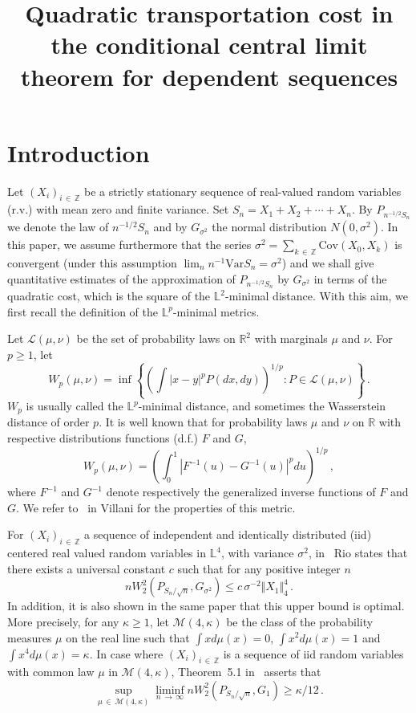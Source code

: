 \documentclass[AHL,Unicode,longabstracts,published]{cedram}
\title[Quadratic transportation cost in the conditional CLT]{Quadratic transportation cost in the conditional central limit theorem for dependent sequences}
\author[\initial{J.} \lastname{Dedecker}]{\firstname{Jérôme} \lastname{Dedecker}}
\author[\initial{F.} \lastname{Merlevède}]{\firstname{Florence} \lastname{Merlevède}}
\author[\initial{E.} \lastname{Rio}]{\firstname{Emmanuel} \lastname{Rio}}
\newcommand{\bbZ}{\mathbb{Z}}
\newcommand{\clL}{\mathcal{L}}
\newcommand{\clM}{\mathcal{M}}
\newcommand{\bbR}{\mathbb{R}}
\newcommand{\bbL}{\mathbb{L}}
\newcommand{\Cov}{\mathrm{Cov}}
\newcommand{\Var}{\mathrm{Var}}
\begin{document}
\maketitle

\section{Introduction}

Let $(X_i)_{i\,\in\,\bbZ}$ be a strictly stationary sequence of real-valued random variables (r.v.) with mean zero and finite variance. Set $S_n = X_1 + X_2 + \cdots + X_n$. By $P_{n^{-1/2}S_n}$ we denote the law of $n^{-1/2}S_{n}$ and by $G_{\sigma^2}$ the normal distribution $ N(0, \sigma^2)$. In this paper, we assume furthermore that the series $\sigma^2=\sum_{k\,\in\,\bbZ} \Cov (X_0,X_k)$ is convergent (under this assumption $\lim_n n^{-1} \Var S_n = \sigma^2$) and we shall give quantitative estimates of the approximation of $P_{n^{-1/2}S_n}$ by $G_{\sigma^2}$ in terms of the quadratic cost, which is the square of the $\bbL^2$-minimal distance. With this aim, we first recall the definition of the $\bbL^p$-minimal metrics.

Let $\clL(\mu, \nu)$ be the set of probability laws on $\bbR^2$ with marginals $\mu$ and $\nu$. For $p\geq 1$, let
\[
W_p(\mu, \nu) =  \inf \left\{ \left (\int |x-y|^p P(dx, dy) \right)^{1/p} : P \in \clL(\mu, \nu) \right \} \,.
\]
$W_p$ is usually called the $\bbL^p$-minimal distance, and sometimes the Wasserstein distance of order $p$. It is well known that for probability laws $\mu$ and $\nu$ on $\bbR$ with respective distributions functions (d.f.) $F$ and $G$,
\begin{equation}\label{def2wasser}
W_p(\mu, \nu) = \left(\int_0^1 |F^{-1}(u) - G^{-1}(u) |^p du\right)^{1/p} \,,
\end{equation}
where $F^{-1}$ and $G^{-1}$ denote respectively the generalized inverse functions of $F$ and $G$. We refer to~\cite[Chapter~6]{Vi2009} in Villani for the properties of this metric.

For $(X_i)_{i\,\in\,\bbZ}$ a sequence of independent and identically distributed (iid) centered real valued random variables in $\bbL^4$, with variance $\sigma^2$,  in~\cite[inequality (1.7)]{Rio09} Rio states that there exists a universal constant $c$ such that for any positive integer $n$
\begin{equation}\label{ineRioUB}
n W_2^2 \left(P_{S_n / \sqrt n}, G_{\sigma^2}\right) \leq c \, \sigma^{-2} \Vert X_1 \Vert_4^4 \,.
\end{equation}
In addition, it is also shown in the same paper that this upper bound is optimal. More precisely, for any $\kappa \geq 1$, let $\clM(4, \kappa)$ be the class of the probability measures $\mu$ on the real line such that $\int x d \mu (x) = 0$, $\int x^2 d \mu (x) = 1$ and $\int x^4 d \mu (x) = \kappa$. In case where $(X_i)_{i\,\in\,\bbZ}$ is a sequence of iid random variables with common law $\mu $ in $\clM(4, \kappa)$, Theorem~5.1 in~\cite{Rio09} asserts that
\begin{equation}\label{ineRioLB}
\sup_{\mu\,\in\,\clM(4, \kappa)} \liminf_{n\,\rightarrow\,\infty} n W_2^2 \left(P_{S_n / {\sqrt n} }, G_{1}\right) \geq \kappa /12 \,.
\end{equation}
\end{document}

